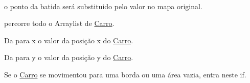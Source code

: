 ~\newline
~\newline
~\newline
~\newline
~\newline
~\newline
~\newline
~\newline
~\newline
~\newline
~\newline
~\newline
~\newline
~\newline
~\newline
~\newline
~\newline
~\newline
~\newline
~\newline
~\newline
~\newline
~\newline
~\newline
~\newline
~\newline
~\newline
~\newline
~\newline
~\newline
~\newline
~\newline
~\newline
~\newline
~\newline
~\newline
~\newline
~\newline
~\newline
~\newline
~\newline
~\newline
~\newline
 o ponto da batida será substituido pelo valor no mapa original.

percorre todo o Arraylist de \mbox{\hyperlink{class_carro}{Carro}}.

Da para x o valor da posição x do \mbox{\hyperlink{class_carro}{Carro}}.

Da para y o valor da posição y do \mbox{\hyperlink{class_carro}{Carro}}.

Se o \mbox{\hyperlink{class_carro}{Carro}} se movimentou para uma borda ou uma área vazia, entra neste if.

